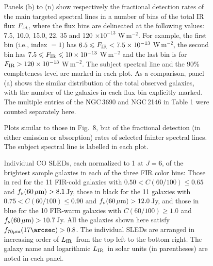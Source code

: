 \documentclass[preprint]{aastex}
\newcommand{\um}{\mbox{$\,\mu{\rm m}$}}
\newcommand{\LIR}{\mbox{$L_{\rm IR}$}}
\begin{document}
\begin{figure}
\centering
{}
\caption{
Panels (b) to (n) show respectively the fractional detection rates of the main targeted spectral 
lines in a number of bins of the total IR flux $F_{\rm IR}$, where the flux bins are delineated 
at the following values: 7.5, 10.0, 15.0, 22, 35 and 120 $\times 10^{-13}$ W\,m$^{-2}$. For example, 
the first bin (i.e., index $= 1$) has $6.5 \leqslant F_{\rm IR} < 7.5 \times 10^{-13}$ W\,m$^{-2}$, 
the second bin has $7.5 \leqslant F_{\rm IR} \leqslant 10 \times 10^{-13}$ W\,m$^{-2}$ and the last
bin is for 
$F_{\rm IR} > 120 \times 10^{-13}$ W\,m$^{-2}$.
The subject spectral line and the 90\% completeness level are marked in each plot.
As a comparison, panel (a) shows the similar distribution of the total observed galaxies, with 
the number of the galaxies in each flux bin explicitly marked.  The multiple 
entries of the NGC\,3690 and NGC\,2146 in Table 1 were counted separately here.
}
\label{Fig8}
\end{figure}
\clearpage






\begin{figure}
\centering
{}
\caption{
Plots similar to those in Fig.~8, but of the fractional detection (in either emission or absorption) rates 
of selected fainter spectral lines.  The subject spectral line is labelled in each plot.
}
\label{Fig9}
\end{figure}
\clearpage



\begin{figure}
\centering
\caption{
Individual CO SLEDs, each normalized to 1 at $J = 6$, of the brightest sample galaxies 
in each of the three FIR color bins:  Those in red for the 11 FIR-cold 
galaxies with $0.50 < C(60/100) \leqslant 0.65$ and $f_{\nu}(60\um) > 8.1\,$Jy,  those 
in black for the 11 galaxies with $0.75 < C(60/100) \leqslant 0.90$ and $f_{\nu}(60\um) 
> 12.0\,$Jy, and those in blue for the 10 FIR-warm galaxies with $C(60/100) \geqslant 
1.0$ and $f_{\nu}(60\um) > 10.7\,$Jy.  
All the galaxies shown here satisfy $f_{70\mu{\rm m}}(17\arcsec) > 0.8$.  The individual 
SLEDs are arranged in increasing order of \LIR\ from the top left to the bottom right. 
The galaxy name and logarithmic \LIR\ in solar units (in parentheses) are noted in each 
panel.
}
\label{Fig10}
\end{figure}
\clearpage
\end{document}
